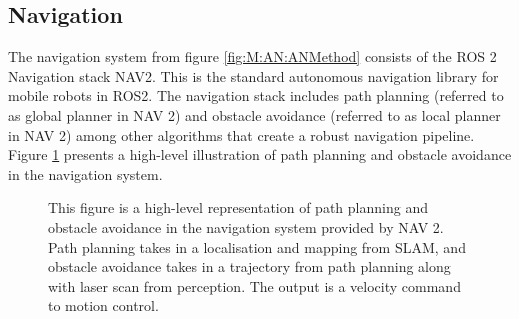 

\subsection{Navigation} \label{sec:M:AN:Navigation}
The navigation system from figure \ref{fig:M:AN:ANMethod} consists of the ROS 2 Navigation stack NAV2. This is the standard autonomous navigation library for mobile robots in ROS2. The navigation stack includes path planning (referred to as global planner in NAV 2) and obstacle avoidance (referred to as local planner in NAV 2) among other algorithms that create a robust navigation pipeline. Figure \ref{fig:M:AN:N:Navigation} presents a high-level illustration of path planning and obstacle avoidance in the navigation system. 

\begin{figure}[htp!]
    \fontsize{7}{14}\selectfont
    \centering
    
    \caption{This figure is a high-level representation of path planning and obstacle avoidance in the navigation system provided by NAV 2. Path planning takes in a localisation and mapping from SLAM, and obstacle avoidance takes in a trajectory from path planning along with laser scan from perception. The output is a velocity command to motion control.}
    \label{fig:M:AN:N:Navigation}
\end{figure}

